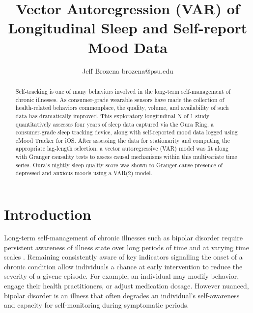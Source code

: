 \documentclass{article}
\begin{document}
\title{Vector Autoregression (VAR) of Longitudinal Sleep and Self-report Mood Data}

\author{\name Jeff Brozena \email brozena@psu.edu}
\maketitle

\begin{abstract}%

  Self-tracking is one of many behaviors involved in the long-term
  self-management of chronic illnesses. As consumer-grade wearable sensors have
  made the collection of health-related behaviors commonplace, the quality,
  volume, and availability of such data has dramatically improved. This
  exploratory longitudinal N-of-1 study quantitatively assesses four years of
  sleep data captured via the Oura Ring, a consumer-grade sleep tracking device,
  along with self-reported mood data logged using eMood Tracker for iOS. After
  assessing the data for stationarity and computing the appropriate lag-length
  selection, a vector autoregressive (VAR) model was fit along with Granger
  causality tests to assess causal mechanisms within this multivariate time
  series. Oura's nightly sleep quality score was shown to Granger-cause
  presence of depressed and anxious moods using a VAR(2) model. 

\end{abstract}

\hypertarget{introduction}{%
\section{Introduction}\label{introduction}}

Long-term self-management of chronic illnesses such as bipolar disorder require
persistent awareness of illness state over long periods of time and at varying
time scales \citep{murnane2016SelfmonitoringPracticesAttitudes,
morton2018TakingBackReins, majid2022ExploringSelftrackingPractices}. Remaining
consistently aware of key indicators signalling the onset of a chronic condition
allow individuals a chance at early intervention to reduce the severity of a
givene episode. For example, an individual may modify behavior, engage their
health practitioners, or adjust medication dosage. However nuanced, bipolar
disorder is an illness that often degrades an individual's self-awareness and
capacity for self-monitoring during symptomatic periods.
\end{document}
